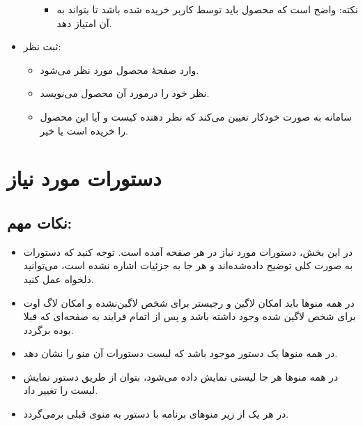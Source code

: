 \documentclass[]{article}
\begin{document}
\begin{itemize}
\begin{itemize}
\begin{itemize}[label = {$\blacksquare$}]

\item
نکته: واضح است که محصول باید توسط کاربر خریده شده باشد تا بتواند به آن امتیاز دهد.

\end{itemize}



\end{itemize}
\item
ثبت نظر:

\begin{itemize}

\item
وارد صفحهٔ محصول مورد نظر می‌شود.

\item
نظر خود را درمورد آن محصول می‌نویسد.

\item
سامانه به صورت خودکار تعیین می‌کند که نظر دهنده کیست و آیا این محصول را خریده است یا خیر.

\end{itemize}

\end{itemize}


\newpage

\section*{{\titr دستورات مورد نیاز}}

\subsection*{{\titr نکات مهم:}}

\begin{itemize}[label={$\bigstar$}]

\item
در این بخش، دستورات مورد نیاز در هر صفحه آمده‌ است. توجه کنید که دستورات به صورت کلی توضیح داده‌شده‌اند و هر جا به جزئیات اشاره نشده‌ است، می‌توانید دلخواه عمل کنید.

\item
در همه منوها باید امکان لاگین و رجیستر برای شخص لاگین‌نشده و امکان لاگ اوت برای شخص لاگین شده وجود داشته باشد و پس از اتمام فرایند به صفحه‌ای که قبلا بوده برگردد.

\item
در همه منوها یک دستور  موجود باشد که لیست دستورات آن منو را نشان دهد.

\item
در همه منوها هر جا لیستی نمایش داده می‌شود، بتوان از طریق دستور  نمایش لیست را تغییر داد.

\item
در هر یک از زیر منوهای برنامه با دستور  به منوی قبلی برمی‌گردد.



\end{itemize}
\end{document}
